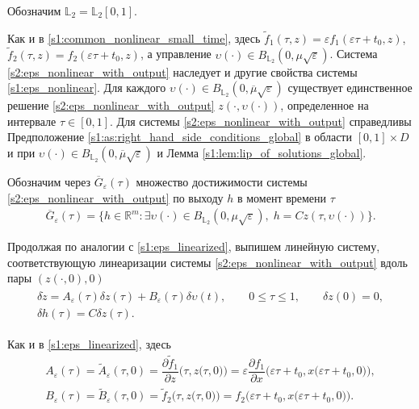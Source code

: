 \documentclass[../main.tex]{subfiles}
\begin{document}
Обозначим $\mathbb{L}_2 = \mathbb{L}_2[0, 1]$. 

Как и в \eqref{s1:common_nonlinear_small_time}, здесь $ \widetilde{f}_1(\tau,z) = \varepsilon f_1(\varepsilon \tau + t_0, z) $, $ \widetilde{f}_2 (\tau,z) = f_2(\varepsilon \tau + t_0,z)$, а управление $ \upsilon(\cdot) \in B_{\mathbb{L}_2}(0, \mu\sqrt{\varepsilon})$.
Система \eqref{s2:eps_nonlinear_with_output} наследует и другие свойства системы \eqref{s1:eps_nonlinear}.
Для каждого $\upsilon(\cdot) \in B_{\mathbb{L}_2} (0, \overline{\mu} \sqrt{\varepsilon})$ существует единственное решение \eqref{s2:eps_nonlinear_with_output}  $z(\cdot, \upsilon(\cdot))$, определенное на интервале $\tau \in [0,1]$. 
Для системы \eqref{s2:eps_nonlinear_with_output} справедливы Предположение \ref{s1:as:right_hand_side_conditions_global} в области $[0, 1]\times D$ и при $\upsilon(\cdot) \in B_{\mathbb{L}_2}(0, \overline{\mu}\sqrt{\varepsilon}) $ и 
Лемма \ref{s1:lem:lip_of_solutions_global}.

Обозначим через $\overline{G}_{\varepsilon}(\tau)$ множество достижимости системы \eqref{s2:eps_nonlinear_with_output} по выходу $h$ в момент времени $\tau$
\begin{gather*}
	\overline{G}_{\varepsilon}(\tau)=\{h\in \mathbb{R}^m:\exists \upsilon(\cdot)\in B_{\mathbb{L}_2}(0,\mu\sqrt{\varepsilon}),\; h=Cz(\tau,\upsilon(\cdot))\}.
\end{gather*}

Продолжая по аналогии с \eqref{s1:eps_linearized}, выпишем линейную систему, соответствующую линеаризации системы  \eqref{s2:eps_nonlinear_with_output} вдоль пары $(z(\cdot, 0), 0)$ 
\begin{gather}\label{s2:eps_linearized}
\begin{gathered}
	\delta\dot{z} = A_{\varepsilon}(\tau) \delta z(\tau) + B_{\varepsilon}(\tau) \delta \upsilon(t),\qquad 0 \leqslant \tau \leqslant 1,  \qquad \delta z(0) = 0, \\
	\delta h(\tau) = C \delta z(\tau).
\end{gathered}
\end{gather}

Как и в \eqref{s1:eps_linearized}, здесь 
\begin{gather*}
	A_{\varepsilon}(\tau) =  \widetilde{A}_{\varepsilon}(\tau, 0) = \dfrac{\partial \widetilde{f}_1}{\partial z} \Big(\tau, z\big(\tau, 0 \big)\Big) = \varepsilon \dfrac{\partial f_1}{\partial x} \Big(\varepsilon \tau + t_0 ,x\big(\varepsilon \tau + t_0, 0\big)\Big),  \\
	B_{\varepsilon}(\tau) = \widetilde{B}_{\varepsilon}(\tau, 0) = \widetilde{f}_2 \Big(\tau,z\big(\tau, 0\big)\Big) = f_2 \Big(\varepsilon \tau + t_0, x\big(\varepsilon \tau + t_0, 0\big)\Big).
\end{gather*}  
\end{document}
